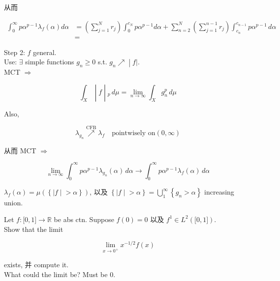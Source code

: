 \documentclass{qlnotes-export}
\begin{document}
从而

\[\begin{matrix}
{\int_{0}^{\infty}p\alpha^{p - 1}\lambda_{f}(\alpha)d\alpha} & {= (\sum\limits_{j = 1}^{N}r_{j})\int_{0}^{c_{N}}p\alpha^{p - 1}d\alpha + \sum\limits_{n = 2}^{N}(\sum\limits_{j = 1}^{n - 1}r_{j})\int_{c_{n}}^{c_{n - 1}}p\alpha^{p - 1}\, d\alpha} \\
 & =
\end{matrix}\]

Step 2: \(f\) general.\\
Use: \(\exists\) simple functions \(g_{n} \geq 0\) s.t. \(\left. g_{n}\operatorname{\nearrow ︎} \middle| f| \right.\).\\
MCT \(\Longrightarrow\)

\[\left. \int_{X} \middle| f \middle| {}_{p}\, d\mu = \lim\limits_{n\rightarrow\infty}\int_{X}g_{n}^{p}\, d\mu \right.\]

Also,

\[\lambda_{g_{n}}\operatorname{\nearrow ︎}\limits^{\text{CFB}}\lambda_{f}\quad\text{pointwisely on}(0,\infty)\]

从而 MCT \(\Longrightarrow\)

\[\lim\limits_{n\rightarrow\infty}\int_{0}^{\infty}p\alpha^{p - 1}\lambda_{g_{n}}(\alpha)\, d\alpha\rightarrow\int_{0}^{\infty}p\alpha^{p - 1}\lambda_{f}(\alpha)\, d\alpha\]

\(\lambda_{f}(\alpha) = \mu(\left\{ |f \middle| > \alpha \right\})\), 以及 \(\left\{ |f \middle| > \alpha \right\} = \bigcup_{1}^{\infty}\left\{ {g_{n} > \alpha} \right\}\) increasing union.

\begin{example}

Let \(f:\lbrack 0,1\rbrack\rightarrow{\mathbb{R}}\) be abs ctn. Suppose \(f(0) = 0\) 以及 \(f^{1} \in L^{2}(\lbrack 0,1\rbrack)\).\\
Show that the limit

\[\lim\limits_{x\rightarrow 0^{+}}x^{- 1/2}f(x)\]

exists, 并 compute it.\\
What could the limit be? Must be \(0\).\\

\end{example}
\end{document}
